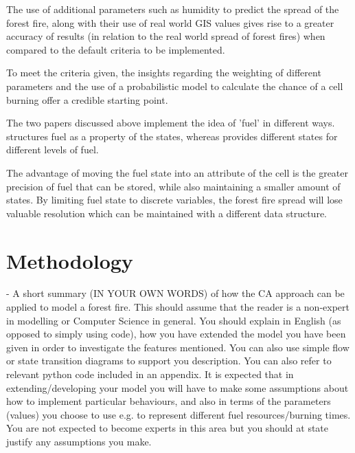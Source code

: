 \documentclass[11pt, a4paper, titlepage]{article}
\begin{document}
  
    

  
  
  
  
  

  The use of additional parameters such as humidity to predict the spread of the forest fire, along with their use of real world GIS values gives rise to a greater accuracy of results (in relation to the real world spread of forest fires) when compared to the default criteria to be implemented.

  To meet the criteria given, the insights regarding the weighting of different parameters and the use of a probabilistic model to calculate the chance of a cell burning offer a credible starting point.

  The two papers discussed above implement the idea of 'fuel' in different ways. \cite{ALEXANDRIDIS2008191} structures fuel as a property of the states, whereas \cite{HERNANDEZENCINAS20071213} provides different states for different levels of fuel. 
  
  The advantage of moving the fuel state into an attribute of the cell is the greater precision of fuel that can be stored, while also maintaining a smaller amount of states. By limiting fuel state to discrete variables, the forest fire spread will lose valuable resolution which can be maintained with a different data structure.

\section{Methodology}
\begin{displayquote}
  - A short summary (IN YOUR OWN WORDS) of how the CA approach can
  be applied to model a forest fire. This should assume that the reader is a non-expert in modelling or
  Computer Science in general. You should explain in English (as opposed to simply using code), how
  you have extended the model you have been given in order to investigate the features mentioned.
  You can also use simple flow or state transition diagrams to support you description. You can also
  refer to relevant python code included in an appendix.
  It is expected that in extending/developing your model you will have to make some assumptions
  about how to implement particular behaviours, and also in terms of the parameters (values) you
  choose to use e.g. to represent different fuel resources/burning times. You are not expected to
  become experts in this area but you should at state justify any assumptions you make.
\end{displayquote} 
\end{document}
